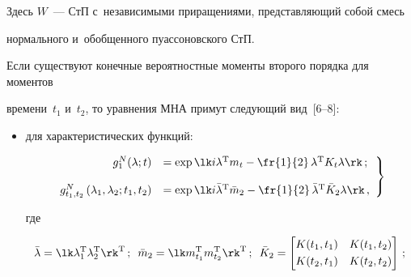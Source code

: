 Здесь $W$~--- СтП с~независимыми приращениями, представляющий собой смесь 

нормального и~обобщенного пуассоновского СтП.



Если существуют конечные вероятностные моменты второго порядка для моментов 

времени~$t_1$ и~$t_2$, то уравнения МНА примут следующий вид~[6--8]:

\begin{itemize}

\item  для характеристических функций:

    \begin{equation}

    \left.

    \begin{array}{rl}

    g_1^N (\lambda;t) &=\exp \lk i\lambda^{\mathrm{T}} m_t - \fr{1}{2}\, \lambda^{\mathrm{T}} 

    K_t \lambda\rk\,;\\[12pt]

    g_{t_1, t_2}^N \left(\lambda_1, \lambda_2;t_1, t_2 \right) &=

    \exp \lk i\bar \lambda^{\mathrm{T}} \bar m_2 - \fr{1}{2}\,\bar \lambda^{\mathrm{T}}

     \bar K_2 \lambda\rk\,,

     \end{array}

     \right\}

     \label{e3.3-s1}

     \end{equation}

где

    $$

    \bar \lambda =\lk \lambda_1^{\mathrm{T}}\lambda_2^{\mathrm{T}}\rk^{\mathrm{T}}\,; 

    \enskip\bar m_2 = \lk m_{t_1}^{\mathrm{T}} m_{t_2}^{\mathrm{T}}\rk^{\mathrm{T}}\,;

    \enskip \bar K_2= \begin{bmatrix}

    K(t_1, t_1)& K(t_1, t_2)\\[3pt]

    K(t_2, t_1)& K(t_2, t_2)\end{bmatrix}\,;

    $$




\end{itemize}
